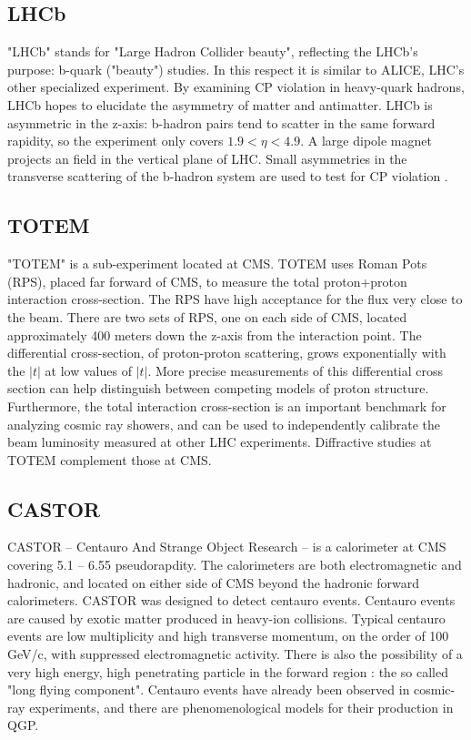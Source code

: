 \subsection{LHCb}

"LHCb" stands for "Large Hadron Collider beauty", reflecting the LHCb's purpose: b-quark ("beauty") studies. In this respect it is similar to ALICE, LHC's other specialized experiment. By examining CP violation in heavy-quark hadrons, LHCb hopes to elucidate the asymmetry of matter and antimatter. LHCb is asymmetric in the z-axis: b-hadron pairs tend to scatter in the same forward rapidity, so the experiment only covers $1.9<\eta<4.9$. A large dipole magnet projects an field in the vertical plane of LHC. Small asymmetries in the transverse scattering of the b-hadron system are used to test for CP violation \cite{Alves:2008zz}. 

\subsection{TOTEM}

"TOTEM" is a sub-experiment located at CMS. TOTEM uses Roman Pots (RPS), placed far forward of CMS, to measure the total proton+proton interaction cross-section. The RPS have high acceptance for the flux very close to the beam. There are two sets of RPS, one on each side of CMS, located approximately 400 meters down the z-axis from the interaction point. The differential cross-section, of proton-proton scattering, grows exponentially with the $|t|$ at low values of $|t|$. More precise measurements of this differential cross section can help distinguish between competing models of proton structure. Furthermore, the total interaction cross-section is an important benchmark for analyzing cosmic ray showers, and can be used to independently calibrate the beam luminosity measured at other LHC experiments. Diffractive studies at TOTEM complement those at CMS.

\subsection{CASTOR}

CASTOR -- Centauro And Strange Object Research -- is a calorimeter at CMS covering 5.1 -- 6.55 pseudorapdity. The calorimeters are both electromagnetic and hadronic, and located on either side of CMS beyond the hadronic forward calorimeters. CASTOR was designed to detect centauro events. Centauro events are caused by exotic matter produced in heavy-ion collisions. Typical centauro events are low multiplicity and high transverse momentum, on the order of 100 GeV/c, with suppressed electromagnetic activity. There is also the possibility of a very high energy, high penetrating particle in the forward region : the so called "long flying component". Centauro events have already been observed in cosmic-ray experiments, and there are phenomenological models for their production in QGP. \cite{Andreev:2010zzb}

